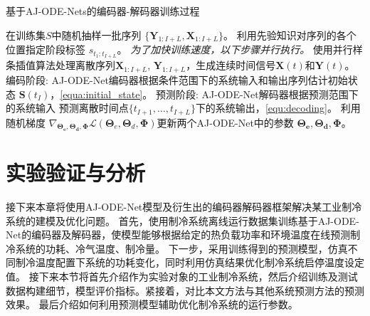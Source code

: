 \begin{algorithm*}[]
\caption{ 基于AJ-ODE-Nets的编码器-解码器训练过程 }
\label{alg:training}
\begin{algorithmic}[1]
\State  在训练集$S$中随机抽样一批序列 $\{\boldsymbol{Y}_{1:I+L}, {\boldsymbol {X}}_{1:I+L}\}$。
\State 利用先验知识对序列的各个位置指定阶段标签 $s_{t_1:t_{I+L}}$。
\State \text{//}\textit{为了加快训练速度，以下步骤并行执行。}
\State 使用并行样条插值算法处理离散序列${\boldsymbol {X}}_{1:I+L}$, $\boldsymbol{Y}_{1:I+L}$，生成连续时间信号$\boldsymbol X(t)$和$\boldsymbol Y(t)$。
\State 编码阶段: AJ-ODE-Net编码器根据条件范围下的系统输入和输出序列估计初始状态 $\boldsymbol{S}\left(t_{I}\right)$，\eqref{equa:initial_state}。
\State 预测阶段: AJ-ODE-Net解码器根据预测范围下的系统输入 预测离散时间点$\{t_{I+1}, \dots, t_{I+L}\}$下的系统输出，\eqref{equ:decoding}。
\State 利用随机梯度 $\nabla_{\boldsymbol{\Theta_{e}}, \boldsymbol{\Theta_{d}}, \boldsymbol \Phi}\mathcal{L}\left(\boldsymbol{\Theta}_{e}, \boldsymbol{\Theta}_{d}, \boldsymbol{\Phi}\right)$更新两个AJ-ODE-Net中的参数 $\boldsymbol{\Theta_{e}}, \boldsymbol{\Theta_{d}}, \boldsymbol \Phi$。
\EndFor
\EndFor
\end{algorithmic}
\end{algorithm*}


\section{实验验证与分析}
\label{sec:evalutaion}
接下来本章将使用AJ-ODE-Net模型及衍生出的编码器解码器框架解决某工业制冷系统的建模及优化问题。
首先，使用制冷系统离线运行数据集训练基于AJ-ODE-Net的编码器及解码器，使模型能够根据给定的热负载功率和环境温度在线预测制冷系统的功耗、冷气温度、制冷量。
下一步，采用训练得到的预测模型，仿真不同制冷温度配置下系统的功耗变化，同时利用仿真结果优化制冷系统启停温度设定值。
接下来本节将首先介绍作为实验对象的工业制冷系统，然后介绍训练及测试数据构建细节，模型评价指标。紧接着，对比本文方法与其他系统预测方法的预测效果。
最后介绍如何利用预测模型辅助优化制冷系统的运行参数。


